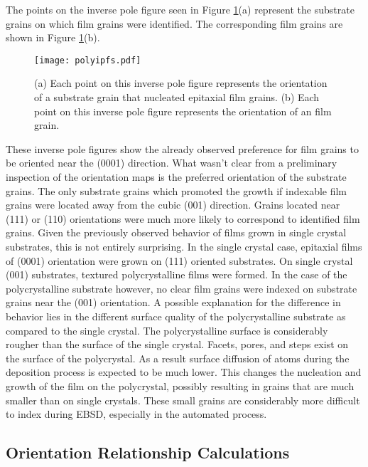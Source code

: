 The points on the inverse pole figure seen in Figure \ref{fig:polyipfs}(a) represent the substrate grains on which film grains were identified. The corresponding film grains are shown in Figure \ref{fig:polyipfs}(b).
\begin{figure}
	\texttt{[image: polyipfs.pdf]}
		\caption[Orientations of film and substrate grains]{%
			(a) Each point on this inverse pole figure represents the orientation of a  substrate grain that nucleated epitaxial film grains. (b) Each point on this inverse pole figure represents the orientation of an  film grain.}
	\label{fig:polyipfs}
\end{figure}
These inverse pole figures show the already observed preference for film grains to be oriented near the (0001) direction. What wasn't clear from a preliminary inspection of the orientation maps is the preferred orientation of the substrate grains. The only substrate grains which promoted the growth if indexable film grains were located away from the cubic (001) direction. Grains located near (111) or (110) orientations were much more likely to correspond to identified film grains. Given the previously observed behavior of films grown in single crystal substrates, this is not entirely surprising. In the single crystal case, epitaxial films of (0001) orientation were grown on (111) oriented  substrates. On single crystal (001) substrates, textured polycrystalline  films were formed. In the case of the polycrystalline substrate however, no clear film grains were indexed on substrate grains near the (001) orientation. A possible explanation for the difference in behavior lies in the different surface quality of the polycrystalline substrate as compared to the single crystal. The polycrystalline surface is considerably rougher than the surface of the single crystal. Facets, pores, and steps exist on the surface of the polycrystal. As a result surface diffusion of atoms during the deposition process is expected to be much lower. This changes the nucleation and growth of the film on the polycrystal, possibly resulting in grains that are much smaller than on single crystals. These small grains are considerably more difficult to index during EBSD, especially in the automated process.

\subsection{Orientation Relationship Calculations}\label{subsec:ch6orientations}

